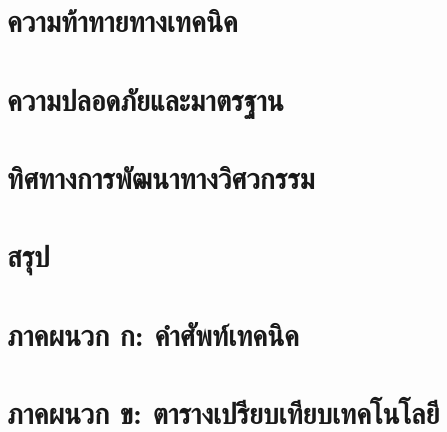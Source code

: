 \documentclass[a4paper]{article}
\begin{document}
\section{ความท้าทายทางเทคนิค}
\begin{justify}
\end{justify}

\section{ความปลอดภัยและมาตรฐาน}
\begin{justify}
\end{justify}

\section{ทิศทางการพัฒนาทางวิศวกรรม}
\begin{justify}
\end{justify}

\section{สรุป}
\begin{justify}
\end{justify}

\printbibliography[title=เอกสารอ้างอิง]

\appendix
\section{ภาคผนวก ก: คำศัพท์เทคนิค}
\begin{justify}
\end{justify}

\section{ภาคผนวก ข: ตารางเปรียบเทียบเทคโนโลยี}
\begin{justify}
\end{justify}
\end{document}
